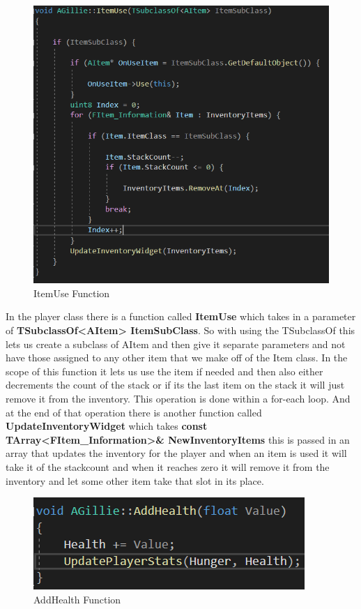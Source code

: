 \begin{figure}[H]
    \centering
    \includegraphics[scale=.4]{img/ItemUse.PNG}
    \caption{ItemUse Function}
    \label{ItemUse}
\end{figure}
In the player class there is a function called \textbf{ItemUse} which takes in a parameter of \textbf{TSubclassOf<AItem> ItemSubClass}. So with using the TSubclassOf this lets us create a subclass of AItem and then give it separate parameters and not have those assigned to any other item that we make off of the Item class. In the scope of this function it lets us use the item if needed and then also either decrements the count of the stack or if its the last item on the stack it will just remove it from the inventory. This operation is done within a for-each loop. And at the end of that operation there is another function called  \textbf{UpdateInventoryWidget} which takes \textbf{const TArray<FItem\_Information>\& NewInventoryItems} this is passed in an array that updates the inventory for the player and when an item is used it will take it of the stackcount and when it reaches zero it will remove it from the inventory and let some other item take that slot in its place.
\begin{figure}[H]
    \centering
    \includegraphics[scale=.6]{img/AddHealth.PNG}
    \caption{AddHealth Function}
    \label{HealthFunction}
\end{figure}
